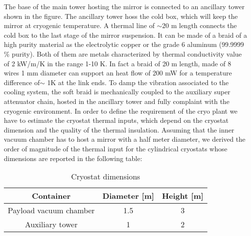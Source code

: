 The base of the main tower hosting the mirror is connected to an ancillary tower shown in the figure. The ancillary tower  hoss the cold box, which will keep the mirror at cryogenic temperature. 
A thermal line of $\sim 20$ m length connects the cold box to the last stage of the mirror suspension. It can be made of a braid of a high purity material as the electrolytic copper or the grade 6 aluminum (99.9999 \% purity). Both of them are metals characterized by thermal conductivity value of 2 kW/m/K in the range 1-10 K. In fact a braid of 20 m length, made of 8 wires 1 mm diameter can support an heat flow of 200 mW for a temperature difference of$\sim$ 1K at the link ends. To damp the vibration associated to the cooling system, the soft braid is mechanically coupled to the auxiliary super attenuator chain, hosted in the ancillary tower and fully complaint with the cryogenic environment. In order to define the requirement of the cryo plant we have to estimate the cryostat thermal inputs, which depend on the cryostat dimension and the quality of the thermal insulation. \noindent Assuming that the inner vacuum chamber has to host a mirror with a half meter diameter, we derived the order of magnitude of the thermal input for the cylindrical cryostats whose dimensions are reported in the following table: 
\begin{table}[htp] 
\caption{Cryostat dimensions} 
\begin{center} 
\begin{tabular}{|c|c|c|} \hline \hline Container & Diameter [m] & Height [m]\\ \hline Payload vacuum chamber & 1.5 & 3 \\ Auxiliary tower & 1 & 2 \\ \hline \hline
\end{tabular} 
\end{center} 
\label{tab:cryostat_dimension} 
\end{table} 

